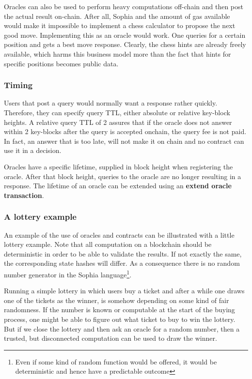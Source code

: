 Oracles can also be used to perform heavy computations off-chain and
then post the actual result on-chain. After all, Sophia and the amount
of gas available would make it impossible to implement a chess
calculator to propose the next good move. Implementing this as an
oracle would work. One queries for a certain position and gets a best
move response. Clearly, the chess hints are already freely available, which harms
this business model more than the fact that hints for specific
positions becomes public data.

\subsubsection{Timing}

Users that post a query would normally want a response rather
quickly. Therefore, they can specify query TTL, either absolute
or relative key-block heights. A relative query TTL of 2 assures
that if the oracle does not answer within 2 key-blocks after the query
is accepted onchain, the query fee is not paid. In fact, an answer that is too
late, will not make it on chain and no contract can use it in a
decision.

Oracles have a specific lifetime, supplied in block height when
registering the oracle. After that block height, queries to the oracle
are no longer resulting in a response. The lifetime of an oracle can
be extended using an \textbf{extend oracle transaction}.


\subsubsection{A lottery example}

An example of the use of oracles and contracts can be illustrated with
a little lottery example. Note that all computation on a blockchain
should be deterministic in order to be able to validate the
results. If not exactly the same, the corresponding state hashes will
differ. As a consequence there is no random number generator in the
Sophia language\footnote{Even if some kind of random function would be
  offered, it would be deterministic and hence have a predictable
  outcome}.

Running a simple lottery in which users buy a ticket and after a while
one draws one of the tickets as the winner, is somehow depending on
some kind of fair randomness. If the number is known or computable at
the start of the buying process, one might be able to figure out what
ticket to buy to win the lottery. But if we close the lottery and then
ask an oracle for a random number, then a trusted, but disconnected
computation can be used to draw the winner.

